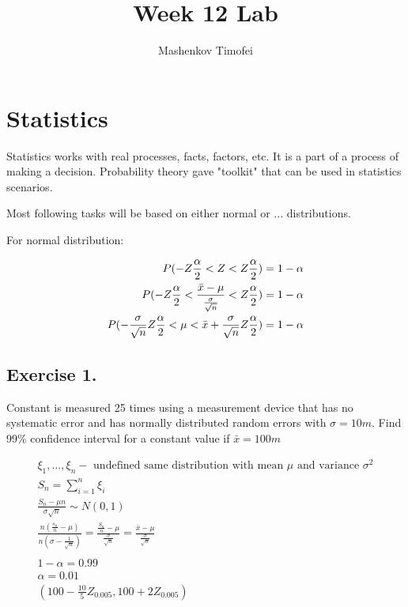 \documentclass{article}
\title{Week 12 Lab}
\author{Mashenkov Timofei}
\begin{document}
\maketitle{}

\section*{Statistics}

Statistics works with real processes, facts, factors, etc. It is a part of a process of making a decision. Probability theory gave "toolkit" that can be used in statistics scenarios.

Most following tasks will be based on either normal or ... distributions.

For normal distribution:

\begin{equation*}
  \begin{aligned}
    P(-Z\frac{\alpha}{2}<Z<Z\frac{\alpha}{2})=1-\alpha\\ 
    P(-Z\frac{\alpha}{2}<\frac{\bar{x}-\mu}{\frac{\sigma}{\sqrt{n}}}<Z\frac{\alpha}{2})=1-\alpha \cr
    P(-\frac{\sigma}{\sqrt{n}}Z\frac{\alpha}{2}<\mu<\bar{x}+\frac{\sigma}{\sqrt{n}}Z\frac{\alpha}{2})=1-\alpha \cr
  \end{aligned}
\end{equation*}

\subsection*{Exercise 1.}
Constant is measured 25 times using a measurement device that has no systematic error and has normally distributed random errors with $\sigma = 10m$. Find 99\% confidence interval for a constant value if $\bar{x} = 100m$

\begin{fleqn}[1\parindent]
  \begin{gather*}
    \xi_1,\dots,\xi_n - \text{ undefined same distribution with mean } \mu \text{ and variance } \sigma^2 \\
    S_n = \sum_{i = 1}^n{\xi_i} \\ 
    \frac{S_n - \mu n}{\sigma \sqrt{n}} \sim N(0,1) \\
    \frac{n(\frac{s_n}{n} - \mu)}{n(\sigma - \frac{1}{\sqrt{n}})} = \frac{\frac{S_n}{n} -
    \mu}{\frac{\sigma}{\sqrt{n}}} = \frac{\bar{x} - \mu}{\frac{\sigma}{\sqrt{n}}} \\ \\
    1 - \alpha = 0.99 \\ 
    \alpha = 0.01 \\ 
    (100 - \frac{10}{5}Z_{0.005}, 100 + 2Z_{0.005}) \\
  \end{gather*}
\end{fleqn}
\end{document}
